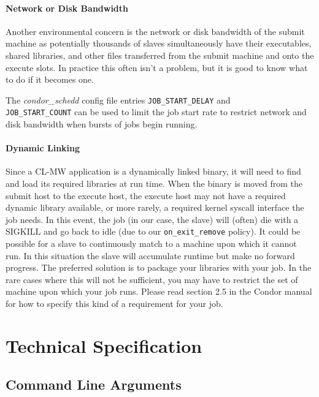 \documentclass[titlepage,12pt]{book}
\newcommand{\xsmall}{\latexhtml{\small}{}}
\newcommand{\xnormalsize}{\latexhtml{\normalsize}{}}
\newcommand{\clmw}{\xsmall\textsc{CL-MW}\xnormalsize\xspace}
\begin{document}
\subsubsection{Network or Disk Bandwidth}

Another environmental concern is the network or disk bandwidth of the
submit machine as potentially thousands of slaves simultaneously have
their executables, shared libraries, and other files transferred from
the submit machine and onto the execute slots.  In practice this often
isn't a problem, but it is good to know what to do if it becomes one.

The \textit{condor\_schedd} config file entries
\texttt{JOB\_START\_DELAY} and\\ \texttt{JOB\_START\_COUNT} can be used
to limit the job start rate to restrict network and disk bandwidth
when bursts of jobs begin running.

\subsubsection{Dynamic Linking}

Since a \clmw application is a dynamically linked binary, it will need
to find and load its required libraries at run time.  When the binary
is moved from the submit host to the execute host, the execute host
may not have a required dynamic library available, or more rarely,
a required kernel syscall interface the job needs. In this event, the
job (in our case, the slave) will (often) die with a SIGKILL and go
back to idle (due to our \texttt{on\_exit\_remove} policy). It could
be possible for a slave to continuously match to a machine upon which
it cannot run. In this situation the slave will accumulate runtime
but make no forward progress. The preferred solution is to package
your libraries with your job. In the rare cases where this will not
be sufficient, you may have to restrict the set of machine upon which
your job runs.  Please read section 2.5 in the Condor manual for how
to specify this kind of a requirement for your job.

\chapter{Technical Specification}

\section{Command Line Arguments}
\label{command-line-arguments}
\end{document}
